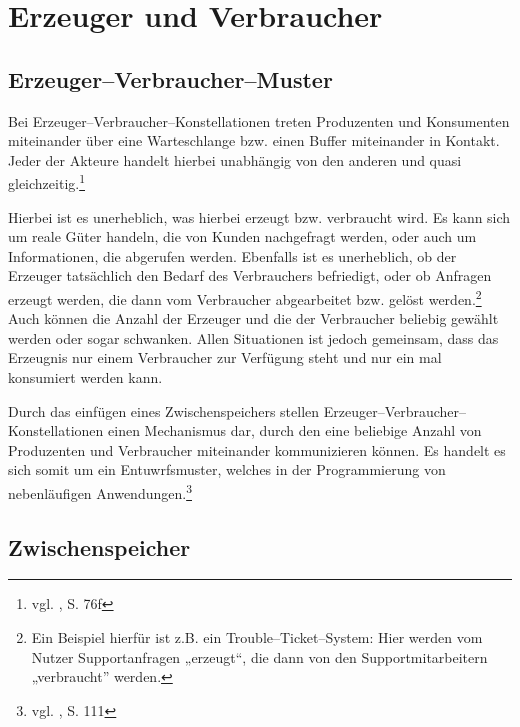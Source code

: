 
\section{Erzeuger und Verbraucher} %
\label{sec:erzeuger_und_verbraucher}

\subsection{Erzeuger–Verbraucher–Muster} %
\label{sub:erzeuger_verbraucher_muster}

Bei Erzeuger–Verbraucher–Konstellationen treten Produzenten und Konsumenten miteinander über eine Warteschlange bzw. einen Buffer miteinander in Kontakt. Jeder der Akteure handelt hierbei unabhängig von den anderen und quasi gleichzeitig.\footnote{vgl. \cite{osdi}, S. 76f}

Hierbei ist es unerheblich, was hierbei erzeugt bzw. verbraucht wird. Es kann sich um reale Güter handeln, die von Kunden nachgefragt werden, oder auch um Informationen, die abgerufen werden. Ebenfalls ist es unerheblich, ob der Erzeuger tatsächlich den Bedarf des Verbrauchers befriedigt, oder ob Anfragen erzeugt werden, die dann vom Verbraucher abgearbeitet bzw. gelöst werden.\footnote{Ein Beispiel hierfür ist z.B. ein Trouble–Ticket–System: Hier werden vom Nutzer Supportanfragen „erzeugt“, die dann von den Supportmitarbeitern „verbraucht” werden.} 
Auch können die Anzahl der Erzeuger und die der Verbraucher beliebig gewählt werden oder sogar schwanken. Allen Situationen ist jedoch gemeinsam, dass das Erzeugnis nur einem Verbraucher zur Verfügung steht und nur ein mal konsumiert werden kann.

Durch das einfügen eines Zwischenspeichers stellen Erzeuger–\-Verbraucher–\-Kon\-stel\-lation\-en einen Mechanismus dar, 
durch den eine beliebige Anzahl von Produzenten und Verbraucher miteinander kommunizieren können.
Es handelt es sich somit um ein Entuwrfsmuster, welches in der Programmierung von nebenläufigen Anwendungen.\footnote{vgl. \cite{openmp}, S. 111} 


\subsection{Zwischenspeicher} %
\label{sub:buffer}

